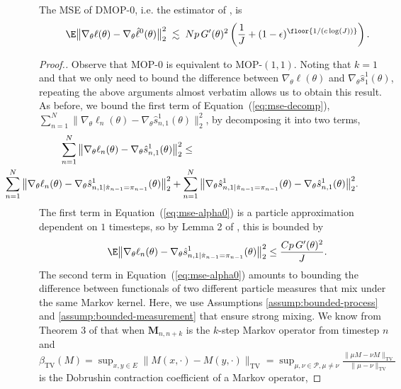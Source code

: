 \begin{cor}
    The MSE of DMOP-$0$, i.e. the estimator of \cite{naesseth18}, is
    \begin{equation}
        \E\big\|\nabla_\theta\ell(\theta) - \nabla_\theta \hat\ell^0(\theta)\big\|_2^2 \; \lesssim 
        \; Np \, G'(\theta)^2\left(\frac{1}{J}+(1-\epsilon)^{\floor{1/(c\log(J))}}\right).
        \label{eq:cor-s1}
    \end{equation}
\end{cor}
\begin{proof}[Proof.]
Observe that MOP-$0$ is equivalent to MOP-$(1,1)$. Noting that $k=1$ and that we only need to bound the difference between $\nabla_\theta \ell(\theta)$ and $\nabla_\theta \hat s_1^1(\theta)$, repeating the above arguments almost verbatim allows us to obtain this result. 
As before, we bound the first term of Equation~(\ref{eq:mse-decomp}), $\sum_{n=1}^N\|\nabla_\theta\ell_n(\theta) - \nabla_\theta\hat s_{n,1}^1(\theta)\|_2^2$, by decomposing it into two terms, 
\begin{eqnarray} \nonumber
\hspace{-5mm} \sum_{n=1}^N\big\|\nabla_\theta\ell_n(\theta) - \nabla_\theta\hat s_{n,1}^1(\theta)\big\|_2^2 &\leq 
\\ &&\hspace{-70mm} 
\sum_{n=1}^N \big\|\nabla_\theta\ell_n(\theta) - \nabla_\theta\hat s_{n,1|\hat\pi_{n-1}=\pi_{n-1}}^1(\theta)\big\|_2^2 + \sum_{n=1}^N \big\|\nabla_\theta\hat s_{n,1|\hat\pi_{n-1}=\pi_{n-1}}^1(\theta) - \nabla_\theta\hat s_{n,1}^1(\theta)\big\|_2^2.
\label{eq:mse-alpha0}
\end{eqnarray}
The first term in Equation~(\ref{eq:mse-alpha0}) is a particle approximation dependent on $1$ timesteps, so by Lemma 2 of \cite{karjalainen23}, this is bounded by
\begin{equation}
\E\big\|\nabla_\theta\ell_n(\theta) - \nabla_\theta\hat s_{n,1|\hat\pi_{n-1}=\pi_{n-1}}^1(\theta)\big\|_2^2 \leq \frac{Cp \, G'(\theta)^2}{J}.
\end{equation}
The second term  in Equation~(\ref{eq:mse-alpha0}) amounts to bounding the difference between functionals of two different particle measures that mix under the same Markov kernel. Here, we use Assumptions \ref{assump:bounded-process} and \ref{assump:bounded-measurement} that ensure strong mixing. We know from Theorem 3 of \cite{karjalainen23} that when $\textbf{M}_{n,n+k}$ is the $k$-step Markov operator from timestep $n$ and $\beta_{\text{TV}}(M) = \sup _{x, y \in E}\|M(x, \cdot)-M(y, \cdot)\|_{\mathrm{TV}}=\sup _{\mu, \nu \in \mathcal{P}, \mu \neq \nu} \frac{\|\mu M-\nu M\|_{\mathrm{TV}}}{\|\mu-\nu\|_{\mathrm{TV}}}$ is the Dobrushin contraction coefficient of a Markov operator, 

\end{proof}
